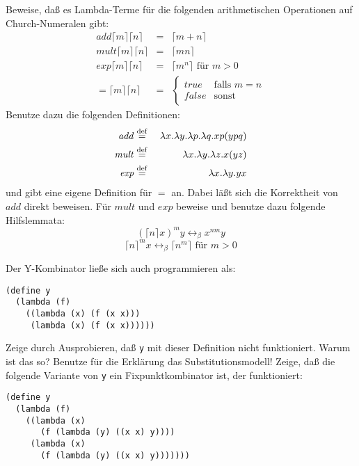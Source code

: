 \begin{aufgabe}\label{ex:church}
  Beweise, daß es Lambda-Terme für die folgenden arithmetischen
  Operationen auf Church-Numeralen gibt:
  \begin{eqnarray*}
    \mathit{add} \lceil m\rceil \lceil n\rceil &=& \lceil m+n\rceil
    \\
    \mathit{mult} \lceil m\rceil \lceil n\rceil &=& \lceil mn\rceil
    \\
    \mathit{exp} \lceil m\rceil \lceil n\rceil &=& \lceil m^n\rceil
    \textrm{ für } m>0\\
    \mathit{=}\lceil m\rceil \lceil n\rceil &=&
    \begin{cases}
      \mathit{true} & \text{falls } m = n\\
      \mathit{false} & \text{sonst}
    \end{cases}
  \end{eqnarray*}
  Benutze dazu die folgenden Definitionen:
  \begin{eqnarray*}
    \mathit{add} &\stackrel{\rm def}{=}{}& \lambda x.\lambda y.\lambda p.\lambda q.xp(ypq)\\
    \mathit{mult} &\stackrel{\rm def}{=}{}& \lambda x.\lambda y.\lambda z.x(yz)\\
    \mathit{exp} &\stackrel{\rm def}{=}{}& \lambda x.\lambda y.y x
  \end{eqnarray*}
  und gibt eine eigene Definition für $=$ an.
  Dabei läßt sich die Korrektheit von $\mathit{add}$ direkt beweisen.
  Für $\mathit{mult}$ und $\mathit{exp}$ beweise und benutze dazu
  folgende Hilfslemmata:
  \begin{displaymath}
    (\lceil n\rceil x)^m y \leftrightarrow_{\beta} x^{nm} y
  \end{displaymath}
  \begin{displaymath}
    \label{eq:lem-2}
    \lceil n\rceil^m x \leftrightarrow_{\beta} \lceil n^m\rceil
    \textrm{ für } m>0
  \end{displaymath}
\end{aufgabe}
\begin{aufgabe}
  Der Y-Kombinator ließe sich auch programmieren
  als:
\begin{verbatim}
(define y 
  (lambda (f)
    ((lambda (x) (f (x x)))
     (lambda (x) (f (x x))))))
\end{verbatim}
  Zeige durch Ausprobieren, daß \texttt{y} mit dieser Definition 
  nicht funktioniert.  Warum ist das so?  Benutze für die
  Erklärung das Substitutionsmodell!
  Zeige, daß die folgende Variante von \texttt{y} ein
  Fixpunktkombinator ist, der funktioniert:
\begin{verbatim}
(define y
  (lambda (f)
    ((lambda (x)
       (f (lambda (y) ((x x) y))))
     (lambda (x)
       (f (lambda (y) ((x x) y)))))))
\end{verbatim}

\end{aufgabe}
